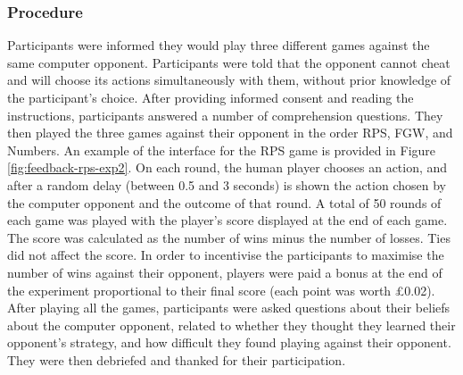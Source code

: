 \documentclass[smallextended]{svjour3}       %
\begin{document}
\begin{table}

\caption{\label{tab:table-actions}Example of how a level-1 and level-2 computer agent plays in response to actions taken in the previous round}
\centering
{}
\end{table}

\hypertarget{procedure}{%
\subsubsection{Procedure}\label{procedure}}

Participants were informed they would play three different games against
the same computer opponent. Participants were told that the opponent
cannot cheat and will choose its actions simultaneously with them,
without prior knowledge of the participant's choice. After providing
informed consent and reading the instructions, participants answered a
number of comprehension questions. They then played the three games
against their opponent in the order RPS, FGW, and Numbers. An example of
the interface for the RPS game is provided in Figure
\ref{fig:feedback-rps-exp2}. On each round, the human player chooses an
action, and after a random delay (between 0.5 and 3 seconds) is shown
the action chosen by the computer opponent and the outcome of that
round. A total of 50 rounds of each game was played with the player's
score displayed at the end of each game. The score was calculated as the
number of wins minus the number of losses. Ties did not affect the
score. In order to incentivise the participants to maximise the number
of wins against their opponent, players were paid a bonus at the end of
the experiment proportional to their final score (each point was worth
£0.02). After playing all the games, participants were asked questions
about their beliefs about the computer opponent, related to whether they
thought they learned their opponent's strategy, and how difficult they
found playing against their opponent. They were then debriefed and
thanked for their participation.
\end{document}
